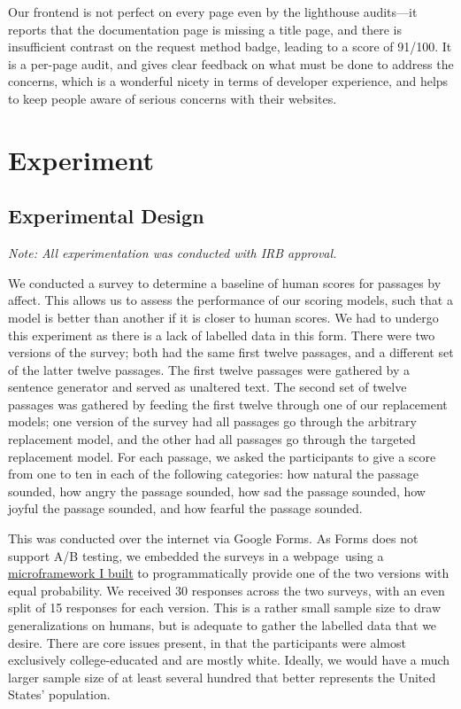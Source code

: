 \documentclass[11pt, twoside, reqno]{book}
\begin{document}
Our frontend is not perfect on every page even by the lighthouse audits—it reports that the documentation page is missing a title page, and there is insufficient contrast on the request method badge, leading to a score of 91/100. It is a per-page audit, and gives clear feedback on what must be done to address the concerns, which is a wonderful nicety in terms of developer experience, and helps to keep people aware of serious concerns with their websites.








\chapter{Experiment}

\section{Experimental Design}

\textit{Note: All experimentation was conducted with IRB approval.}

We conducted a survey to determine a baseline of human scores for passages by affect. This allows us to assess the performance of our scoring models, such that a model is better than another if it is closer to human scores. We had to undergo this experiment as there is a lack of labelled data in this form. There were two versions of the survey; both had the same first twelve passages, and a different set of the latter twelve passages. The first twelve passages were gathered by a sentence generator and served as unaltered text. The second set of twelve passages was gathered by feeding the first twelve through one of our replacement models; one version of the survey had all passages go through the arbitrary replacement model, and the other had all passages go through the targeted replacement model. For each passage, we asked the participants to give a score from one to ten in each of the following categories: how natural the passage sounded, how angry the passage sounded, how sad the passage sounded, how joyful the passage sounded, and how fearful the passage sounded.

This was conducted over the internet via Google Forms. As Forms does not support A/B testing, we embedded the surveys in a webpage using a \href{https://github.com/colehollant/quarantine-js}{microframework I built} to programmatically provide one of the two versions with equal probability. We received 30 responses across the two surveys, with an even split of 15 responses for each version. This is a rather small sample size to draw generalizations on humans, but is adequate to gather the labelled data that we desire. There are core issues present, in that the participants were almost exclusively college-educated and are mostly white. Ideally, we would have a much larger sample size of at least several hundred that better represents the United States' population.
\end{document}
